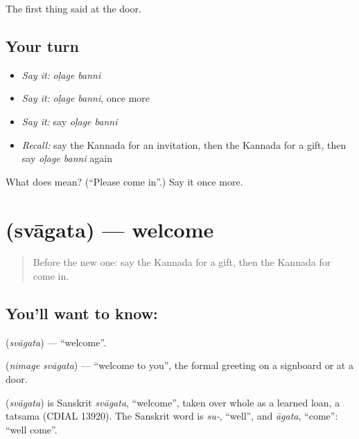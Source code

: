 \begin{grammarlens}[title={What you've built}]
The first thing said at the door.
\end{grammarlens}

\subsection*{Your turn}
\begin{itemize}
\raggedright
  \item \emph{Say it:} \emph{oḷage banni}
  \item \emph{Say it:} \emph{oḷage banni}, once more
  \item \emph{Say it:} say \emph{oḷage banni}
  \item \emph{Recall:} say the Kannada for an invitation, then the Kannada for a gift, then say \emph{oḷage banni} again
\end{itemize}

\begin{tcolorbox}[breakable,colback=teal!4,colframe=teal!35!black,title={Before you move on}]
What does   mean? (\textquotedblleft{}Please come in\textquotedblright{}.) Say it once more.
\end{tcolorbox}
\section[\texorpdfstring{\kn{ಸ್ವಾಗತ} (svāgata)}{ಸ್ವಾಗತ (svāgata)}]{ (svāgata) — welcome}

\label{lesson:KA-C88-welcome}



\begin{quote}
Before the new one: say the Kannada for a gift, then the Kannada for come in.
\end{quote}

\subsection*{You'll want to know: }
\textbf{} (\emph{svāgata}) — \textquotedblleft{}welcome\textquotedblright{}.

\textbf{ } (\emph{nimage svāgata}) — \textquotedblleft{}welcome to you\textquotedblright{}, the formal greeting on a signboard or at a door.

\begin{cousinweb}
\textbf{} (\emph{svāgata}) is Sanskrit \emph{svāgata}, \textquotedblleft{}welcome\textquotedblright{}, taken over whole as a learned loan, a tatsama (CDIAL 13920). The Sanskrit word is \emph{su-}, \textquotedblleft{}well\textquotedblright{}, and \emph{āgata}, \textquotedblleft{}come\textquotedblright{}: \textquotedblleft{}well come\textquotedblright{}.
\end{cousinweb}

